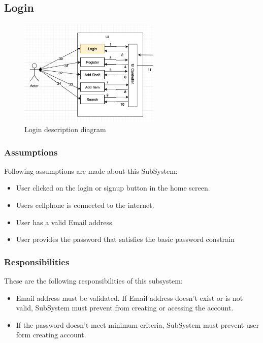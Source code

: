 \subsection{Login}


\begin{figure}[h!]
	\centering
 	\includegraphics[width=0.60\textwidth]{images/login}
 \caption{Login description diagram}
\end{figure}

\subsubsection{Assumptions}
Following assumptions are made about this SubSystem:
\begin{itemize}
    \item User clicked on the login or signup button in the home screen.
    \item Users cellphone is connected to the internet.
    \item User has a valid Email address.
    \item User provides the password that satisfies the basic password constrain
\end{itemize}

\subsubsection{Responsibilities}
These are the following responsibilities of this subsystem:
\begin{itemize}
    \item Email address must be validated. If Email address doesn’t exist or is not valid, SubSystem must prevent from creating or acessing the account.
    \item If the password doesn’t meet minimum criteria, SubSystem must prevent user form creating account.
\end{itemize}

